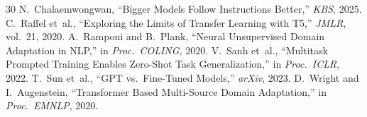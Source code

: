 \documentclass[journal]{IEEEtran}
\begin{document}
\begin{thebibliography}{30}
 N.~Chalaemwongwan, ``Bigger Models Follow Instructions Better,'' \emph{KBS}, 2025.
 C.~Raffel et~al., ``Exploring the Limits of Transfer Learning with T5,'' \emph{JMLR}, vol.~21, 2020.
 A.~Ramponi and B.~Plank, ``Neural Unsupervised Domain Adaptation in NLP,'' in \emph{Proc.\ COLING}, 2020.
 V.~Sanh et~al., ``Multitask Prompted Training Enables Zero-Shot Task Generalization,'' in \emph{Proc.\ ICLR}, 2022.
 T.~Sun et~al., ``GPT vs.\ Fine-Tuned Models,'' \emph{arXiv}, 2023.
 D.~Wright and I.~Augenstein, ``Transformer Based Multi-Source Domain Adaptation,'' in \emph{Proc.\ EMNLP}, 2020.
\end{thebibliography}
\end{document}
